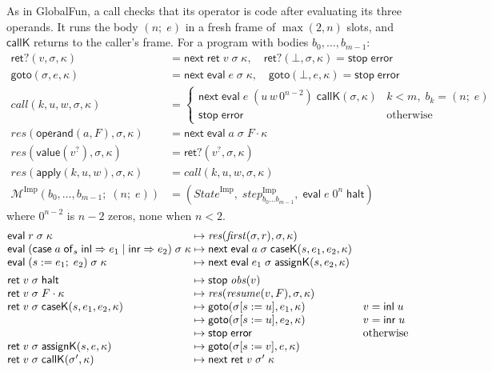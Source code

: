 \documentclass[10pt]{article}
\theoremstyle{acmplain}
\newcommand{\key}[1]{\mathsf{#1}}
\newcommand{\nxt}{\key{next}\;}
\newcommand{\stp}{\key{stop}\;}
\newcommand{\error}{\key{error}}
\newcommand{\retq}{\key{ret?}}
\newcommand{\Mach}[1]{\mathcal{M}^{#1}}
\newcommand{\step}[1]{\mathit{step}^{#1}}
\newcommand{\obs}{\mathit{obs}}
\newcommand{\inlV}{\key{inl}\;}
\newcommand{\inrV}{\key{inr}\;}
\newcommand{\Kf}[2]{\key{#1}(#2)}
\newcommand{\halt}{\key{halt}}
\newcommand{\assign}[3]{#1 \mathrel{:=} #2;\; #3}
\newcommand{\Casei}[4]{\key{case}\;#1\;\key{of}_{#2}\;\key{inl} \Rightarrow #3 \mid \key{inr} \Rightarrow #4}
\newcommand{\evi}[3]{\key{eval}\;#1\;#2\;#3}
\newcommand{\rti}[3]{\key{ret}\;#1\;#2\;#3}
\begin{document}
As in GlobalFun, a call checks that its operator is code after evaluating its
three operands. It runs the body $(n;\; e)$ in a fresh frame of
$\max(2, n)$ slots, and $\key{callK}$ returns to the caller's frame.
For a program with bodies $b_0, \ldots, b_{m-1}$:
\begin{align*}
  \retq(v, \sigma, \kappa) &= \nxt \rti{v}{\sigma}{\kappa}, \quad \retq(\bot, \sigma, \kappa) = \stp \error \\
  \key{goto}(\sigma, e, \kappa) &= \nxt \evi{e}{\sigma}{\kappa}, \quad \key{goto}(\bot, e, \kappa) = \stp \error \\
  \mathit{call}(k, u, w, \sigma, \kappa) &=
    \begin{cases}
      \nxt \evi{e}{(u\, w\, 0^{n-2})}{\Kf{callK}{\sigma, \kappa}} & k < m,\; b_k = (n;\; e) \\
      \stp \error & \text{otherwise}
    \end{cases} \\[1ex]
  \mathit{res}(\key{operand}(a, F), \sigma, \kappa) &= \nxt \evi{a}{\sigma}{F \cdot \kappa} \\
  \mathit{res}(\key{value}(v^?), \sigma, \kappa) &= \retq(v^?, \sigma, \kappa) \\
  \mathit{res}(\key{apply}(k, u, w), \sigma, \kappa) &= \mathit{call}(k, u, w, \sigma, \kappa) \\[1ex]
  \Mach{\mathrm{Imp}}(b_0, \ldots, b_{m-1};\; (n;\; e)) &= (\mathit{State}^{\mathrm{Imp}},\; \step{\mathrm{Imp}}_{b_0 \ldots b_{m-1}},\; \evi{e}{0^n}{\halt})
\end{align*}
where $0^{n-2}$ is $n - 2$ zeros, none when $n < 2$.
\[
\begin{array}{@{}l@{\;\mapsto\;}l@{\quad}l@{}}
  \evi{r}{\sigma}{\kappa} & \mathit{res}(\mathit{first}(\sigma, r), \sigma, \kappa) \\
  \evi{(\Casei{a}{s}{e_1}{e_2})}{\sigma}{\kappa} & \nxt \evi{a}{\sigma}{\Kf{caseK}{s, e_1, e_2, \kappa}} \\
  \evi{(\assign{s}{e_1}{e_2})}{\sigma}{\kappa} & \nxt \evi{e_1}{\sigma}{\Kf{assignK}{s, e_2, \kappa}} \\[1ex]
  \rti{v}{\sigma}{\halt} & \stp \obs(v) \\
  \rti{v}{\sigma}{F \cdot \kappa} & \mathit{res}(\mathit{resume}(v, F), \sigma, \kappa) \\
  \rti{v}{\sigma}{\Kf{caseK}{s, e_1, e_2, \kappa}} & \key{goto}(\sigma[s := u], e_1, \kappa) & v = \inlV u \\
  & \key{goto}(\sigma[s := u], e_2, \kappa) & v = \inrV u \\
  & \stp \error & \text{otherwise} \\
  \rti{v}{\sigma}{\Kf{assignK}{s, e, \kappa}} & \key{goto}(\sigma[s := v], e, \kappa) \\
  \rti{v}{\sigma}{\Kf{callK}{\sigma', \kappa}} & \nxt \rti{v}{\sigma'}{\kappa}
\end{array}
\]
\end{document}
